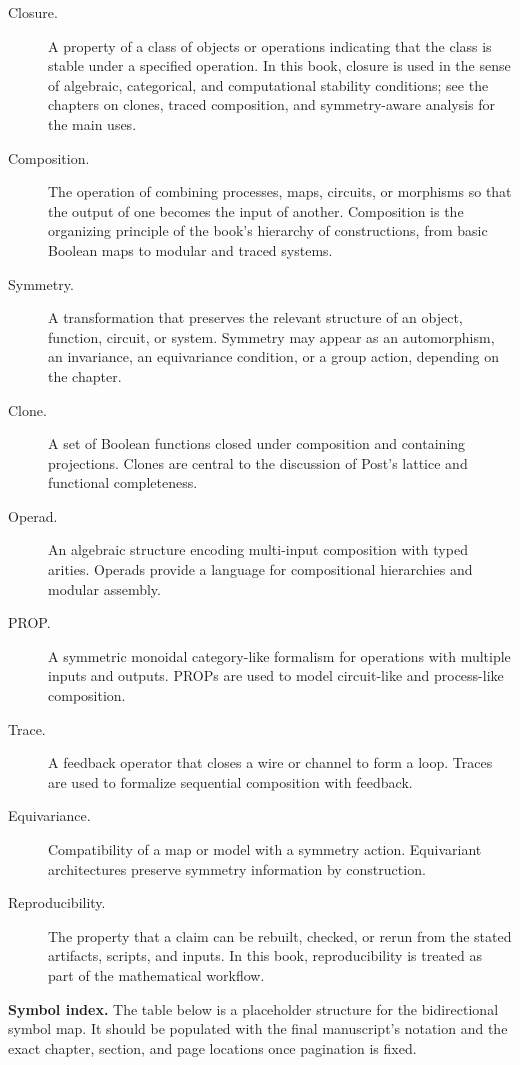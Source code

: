 \begin{description}
  \item[Closure.] A property of a class of objects or operations indicating that the class is stable under a specified operation. In this book, closure is used in the sense of algebraic, categorical, and computational stability conditions; see the chapters on clones, traced composition, and symmetry-aware analysis for the main uses.
  \item[Composition.] The operation of combining processes, maps, circuits, or morphisms so that the output of one becomes the input of another. Composition is the organizing principle of the book's hierarchy of constructions, from basic Boolean maps to modular and traced systems.
  \item[Symmetry.] A transformation that preserves the relevant structure of an object, function, circuit, or system. Symmetry may appear as an automorphism, an invariance, an equivariance condition, or a group action, depending on the chapter.
  \item[Clone.] A set of Boolean functions closed under composition and containing projections. Clones are central to the discussion of Post's lattice and functional completeness.
  \item[Operad.] An algebraic structure encoding multi-input composition with typed arities. Operads provide a language for compositional hierarchies and modular assembly.
  \item[PROP.] A symmetric monoidal category-like formalism for operations with multiple inputs and outputs. PROPs are used to model circuit-like and process-like composition.
  \item[Trace.] A feedback operator that closes a wire or channel to form a loop. Traces are used to formalize sequential composition with feedback.
  \item[Equivariance.] Compatibility of a map or model with a symmetry action. Equivariant architectures preserve symmetry information by construction.
  \item[Reproducibility.] The property that a claim can be rebuilt, checked, or rerun from the stated artifacts, scripts, and inputs. In this book, reproducibility is treated as part of the mathematical workflow.
\end{description}

\medskip

\noindent\textbf{Symbol index.} The table below is a placeholder structure for the bidirectional symbol map. It should be populated with the final manuscript's notation and the exact chapter, section, and page locations once pagination is fixed.

